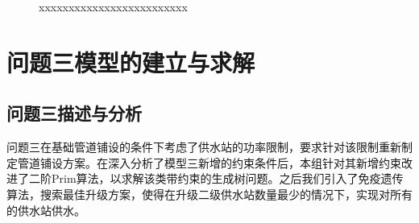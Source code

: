 \documentclass{whutmod}
\begin{document}
			\begin{figure}[H]	
				\centering
				\caption{xxxxxxxxxxxxxxxxxxxxxxxxx}
				\label{fisg}
			\end{figure}

    \section{问题三模型的建立与求解}
   		\subsection{问题三描述与分析}
   		问题三在基础管道铺设的条件下考虑了供水站的功率限制，要求针对该限制重新制定管道铺设方案。在深入分析了模型三新增的约束条件后，本组针对其新增约束改进了二阶Prim算法，以求解该类带约束的生成树问题。之后我们引入了免疫遗传算法，搜索最佳升级方案，使得在升级二级供水站数量最少的情况下，实现对所有的供水站供水。
\end{document}
